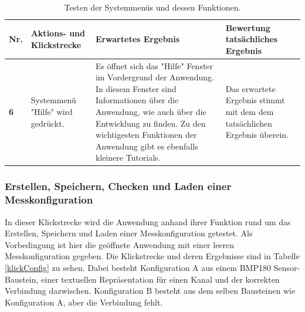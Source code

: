 \documentclass[parskip=full]{scrartcl}
\begin{document}
	\begin{table}[h]
\begin{tabular}{| p{} | p{} | p{} | p{} |}
	\hline
	\textbf{Nr.} & \textbf{Aktions- und Klickstrecke} & \textbf{Erwartetes Ergebnis}  & \textbf{ Bewertung tatsächliches Ergebnis} \\ \hline

	\textbf{6}
	& 
	Systemmenü "Hilfe" wird gedrückt.
	&
	Es öffnet sich das "Hilfe" Fenster im Vordergrund der Anwendung. In diesem Fenster sind Informationen über die 				Anwendung, wie auch über die Entwicklung zu finden. Zu den wichtigesten Funktionen der Anwendung gibt es ebenfalls 			kleinere Tutorials.
	& 
	Das erwartete Ergebnis stimmt mit dem dem tatsächlichen Ergebnis überein.
	\\ \hline

	
\end{tabular}
\caption{Testen der Systemmenüs und dessen Funktionen.}
\label{klickMenu}
\end{table} 

\subsubsection{Erstellen, Speichern, Checken und Laden einer Messkonfiguration}

In dieser Klickstrecke wird die Anwendung anhand ihrer Funktion rund um das Erstellen, Speichern und Laden einer Messkonfiguration getestet. Als Vorbedingung ist hier die geöffnete Anwendung mit einer leeren Messkonfiguration gegeben. Die Klickstrecke und deren Ergebnisse sind in Tabelle \ref{klickConfig} zu sehen. Dabei besteht Konfiguration A aus einem BMP180 Sensor-Baustein, einer textuellen Repräsentation für einen Kanal und der korrekten Verbindung dazwischen. Konfiguration B besteht aus dem selben Bausteinen wie Konfiguration A, aber die Verbindung fehlt.  
\end{document}
